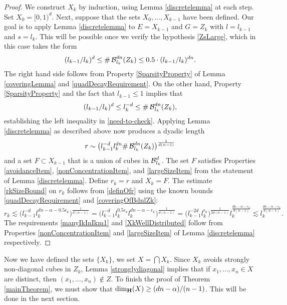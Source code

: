 \begin{proof}
	We construct $X_k$ by induction, using Lemma \ref{discretelemma} at each step. Set $X_0=[0,1)^d$. Next, suppose that the sets $X_0, \ldots, X_{k-1}$ have been defined. Our goal is to apply Lemma \ref{discretelemma} to $E = X_{k-1}$ and $G = Z_k$ with $l = l_{k-1}$ and $s = l_k$. This will be possible once we verify the hypothesis \eqref{ZsLarge}, which in this case takes the form
	\begin{equation}
		(l_{k-1}/l_k)^d \leq \#\operatorname{\mathcal{B}}_{l_k}^{dn}(Z_k) \leq 0.5 \cdot (l_{k-1}/l_k)^{dn}. \label{need-to-check}
	\end{equation}
	The right hand side follows from Property \ref{SparsityProperty} of Lemma \ref{coveringLemma} and \eqref{quadDecayRequirement}. 
	On the other hand, Property \ref{SparsityProperty} and the fact that $l_{k-1} \leq 1$ implies that
	\[ (l_{k-1}/l_k)^d\leq l_{k}^{-d}\leq \#\operatorname{\mathcal{B}}_{l_k}^{dn}(Z_k), \]
	establishing the left inequality in \eqref{need-to-check}. Applying Lemma \ref{discretelemma} as described above now produces a dyadic length
	\begin{equation}\label{definOfr}
		r \sim \big(l_{k-1}^{-d}l_k^{dn} \# \operatorname{\mathcal{B}}^{dn}_{l_k}(Z_k)\big)^{\frac{1}{d(n-1)}} 
	\end{equation}
	and a set $F\subset X_{k-1}$ that is a union of cubes in $\operatorname{\mathcal{B}}_{l_k}^{d}$. The set $F$ satisfies Properties \ref{avoidanceItem}, \ref{nonConcentrationItem}, and \ref{largeSizeItem} from the statement of Lemma \ref{discretelemma}. Define $r_k=r$ and $X_k=F$. The estimate  \eqref{rkSizeBound} on $r_k$ follows from \eqref{definOfr} using the known bounds \eqref{quadDecayRequirement} and \eqref{coveringOfBdnlZk}:
	\[ r_k \lesssim \bigl( l_{k-1}^{-d}  l_k^{dn -\alpha - 0.5 \epsilon_k} \bigr)^{\frac{1}{d(n-1)}} = \bigl( l_{k-1}^{-d} l_k^{0.5 \epsilon_k} l_k^{dn -\alpha - \epsilon_k} \bigr)^{\frac{1}{d(n-1)}} = \bigl( l_{k-1}^{-2d} l_k^{\epsilon_k}\bigr)^{\frac{1}{2d(n-1)}} l_{k}^{\frac{dn-\alpha -\epsilon_k}{d(n-1)}} \lesssim l_{k}^{\frac{dn-\alpha -\epsilon_k}{d(n-1)}}. \]
	The requirements \eqref{manyIkInIkm1} and \eqref{XkWellDistributed} follow from Properties \ref{nonConcentrationItem} and \ref{largeSizeItem} of Lemma \ref{discretelemma} respectively.
\end{proof} 

Now we have defined the sets $\{ X_k \}$, we set $X = \bigcap X_k$. Since $X_k$ avoids strongly non-diagonal cubes in $Z_k$, Lemma \ref{stronglydiagonal} implies that if $x_1, \dots, x_n \in X$ are distinct, then $(x_1, \dots, x_n) \not \in Z$. To finish the proof of Theorem \ref{mainTheorem}, we must show that $\operatorname{\dim_{\mathbf{H}}}(X) \geq (dn - \alpha)/(n - 1)$. This will be done in the next section. 







